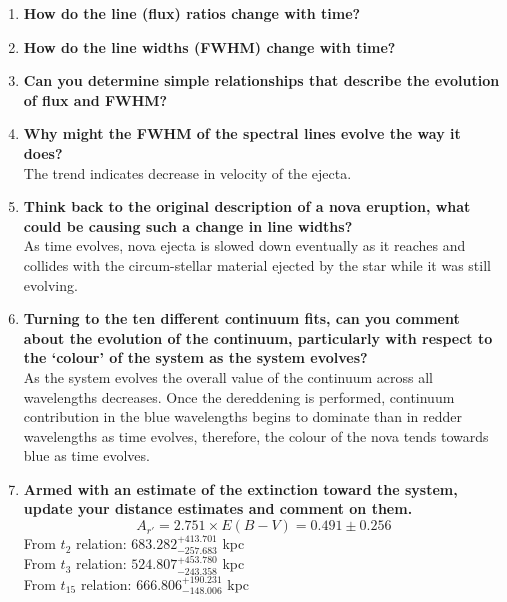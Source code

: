 \documentclass{article}
\begin{document}
\begin{enumerate}
		\item \textbf{How do the line (flux) ratios change with time?} \\

		\item \textbf{How do the line widths (FWHM) change with time?} \\

		\item \textbf{Can you determine simple relationships that describe the evolution of flux and FWHM?} \\

		\item \textbf{Why might the FWHM of the spectral lines evolve the way it does?} \\
		The trend indicates decrease in velocity of the ejecta.

		\item \textbf{Think back to the original description of a nova eruption, what could be causing such a change in line widths?} \\
		As time evolves, nova ejecta is slowed down eventually as it reaches and collides with the circum-stellar material ejected by the star while it was still evolving. 

		\item \textbf{Turning to the ten different continuum fits, can you comment about the evolution of the continuum, particularly with respect to the ‘colour’ of the system as the system evolves?} \\
		As the system evolves the overall value of the continuum across all wavelengths decreases. Once the dereddening is performed, continuum contribution in the blue wavelengths begins to dominate than in redder wavelengths as time evolves, therefore, the colour of the nova tends towards blue as time evolves.

		\item \textbf{Armed with an estimate of the extinction toward the system, update your distance estimates and comment on them.} \\
		\[A_{r'} = 2.751 \times E(B-V) = 0.491 \pm 0.256\]
		From \(t_2\) relation: \(683.282^{+413.701}_{-257.683}\) kpc \\

		From \(t_3\) relation: \(524.807^{+453.780}_{-243.358}\) kpc \\

		From \(t_{15}\) relation: \(666.806^{+190.231}_{-148.006}\) kpc \\


\end{enumerate}
\end{document}
